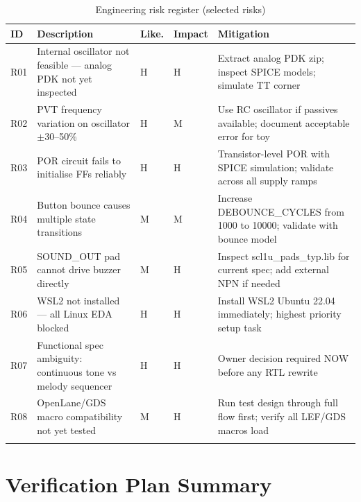 \documentclass[11pt,a4paper]{article}
\begin{document}
\begin{longtable}{p{1cm}p{4.5cm}p{1cm}p{1cm}p{5cm}}
  \toprule
  \textbf{ID} & \textbf{Description} & \textbf{Like.} & \textbf{Impact} & \textbf{Mitigation} \\
  \midrule
  \endhead
  R01 & Internal oscillator not feasible --- analog PDK not yet inspected &
    \textcolor{riskred}{H} & \textcolor{riskred}{H} &
    Extract analog PDK zip; inspect SPICE models; simulate TT corner \\[4pt]
  R02 & PVT frequency variation on oscillator $\pm$30--50\% &
    \textcolor{riskred}{H} & \textcolor{riskamb}{M} &
    Use RC oscillator if passives available; document acceptable error for toy \\[4pt]
  R03 & POR circuit fails to initialise FFs reliably &
    \textcolor{riskred}{H} & \textcolor{riskred}{H} &
    Transistor-level POR with SPICE simulation; validate across all supply ramps \\[4pt]
  R04 & Button bounce causes multiple state transitions &
    \textcolor{riskamb}{M} & \textcolor{riskamb}{M} &
    Increase DEBOUNCE\_CYCLES from 1000 to 10000; validate with bounce model \\[4pt]
  R05 & SOUND\_OUT pad cannot drive buzzer directly &
    \textcolor{riskamb}{M} & \textcolor{riskred}{H} &
    Inspect scl1u\_pads\_typ.lib for current spec; add external NPN if needed \\[4pt]
  R06 & WSL2 not installed --- all Linux EDA blocked &
    \textcolor{riskred}{H} & \textcolor{riskred}{H} &
    Install WSL2 Ubuntu 22.04 immediately; highest priority setup task \\[4pt]
  R07 & Functional spec ambiguity: continuous tone vs melody sequencer &
    \textcolor{riskred}{H} & \textcolor{riskred}{H} &
    Owner decision required NOW before any RTL rewrite \\[4pt]
  R08 & OpenLane/GDS macro compatibility not yet tested &
    \textcolor{riskamb}{M} & \textcolor{riskred}{H} &
    Run test design through full flow first; verify all LEF/GDS macros load \\[4pt]
  \bottomrule
  \caption{Engineering risk register (selected risks)}
\end{longtable}

\section{Verification Plan Summary}
\end{document}
